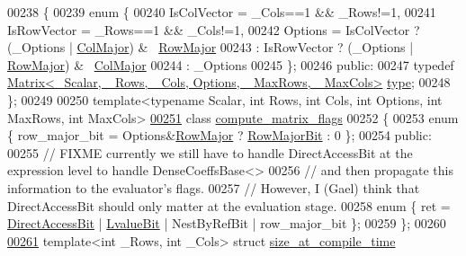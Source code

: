 \begin{DoxyCode}
{00238 \{
00239     \textcolor{keyword}{enum} \{
00240       IsColVector = \_Cols==1 && \_Rows!=1,
00241       IsRowVector = \_Rows==1 && \_Cols!=1,
00242       Options = IsColVector ? (\_Options | \hyperlink{group__enums_ggaacded1a18ae58b0f554751f6cdf9eb13a0cbd4bdd0abcfc0224c5fcb5e4f6669a}{ColMajor}) & ~\hyperlink{group__enums_ggaacded1a18ae58b0f554751f6cdf9eb13acfcde9cd8677c5f7caf6bd603666aae3}{RowMajor}
00243               : IsRowVector ? (\_Options | \hyperlink{group__enums_ggaacded1a18ae58b0f554751f6cdf9eb13acfcde9cd8677c5f7caf6bd603666aae3}{RowMajor}) & ~\hyperlink{group__enums_ggaacded1a18ae58b0f554751f6cdf9eb13a0cbd4bdd0abcfc0224c5fcb5e4f6669a}{ColMajor}
00244               : \_Options
00245     \};
00246   \textcolor{keyword}{public}:
00247     \textcolor{keyword}{typedef} \hyperlink{group___core___module_class_eigen_1_1_matrix}{Matrix<\_Scalar, \_Rows, \_Cols, Options, \_MaxRows, \_MaxCols>}
       \hyperlink{group___core___module_class_eigen_1_1_matrix}{type};
00248 \};
00249 
00250 \textcolor{keyword}{template}<\textcolor{keyword}{typename} Scalar, \textcolor{keywordtype}{int} Rows, \textcolor{keywordtype}{int} Cols, \textcolor{keywordtype}{int} Options, \textcolor{keywordtype}{int} MaxRows, \textcolor{keywordtype}{int} MaxCols>
\hyperlink{class_eigen_1_1internal_1_1compute__matrix__flags}{00251} \textcolor{keyword}{class }\hyperlink{class_eigen_1_1internal_1_1compute__matrix__flags}{compute\_matrix\_flags}
00252 \{
00253     \textcolor{keyword}{enum} \{ row\_major\_bit = Options&\hyperlink{group__enums_ggaacded1a18ae58b0f554751f6cdf9eb13acfcde9cd8677c5f7caf6bd603666aae3}{RowMajor} ? \hyperlink{group__flags_gae4f56c2a60bbe4bd2e44c5b19cbe8762}{RowMajorBit} : 0 \};
00254   \textcolor{keyword}{public}:
00255     \textcolor{comment}{// FIXME currently we still have to handle DirectAccessBit at the expression level to handle
       DenseCoeffsBase<>}
00256     \textcolor{comment}{// and then propagate this information to the evaluator's flags.}
00257     \textcolor{comment}{// However, I (Gael) think that DirectAccessBit should only matter at the evaluation stage.}
00258     \textcolor{keyword}{enum} \{ ret = \hyperlink{group__flags_gabf1e9d0516a933445a4c307ad8f14915}{DirectAccessBit} | \hyperlink{group__flags_gae2c323957f20dfdc6cb8f44428eaec1a}{LvalueBit} | NestByRefBit | row\_major\_bit \};
00259 \};
00260 
\hyperlink{struct_eigen_1_1internal_1_1size__at__compile__time}{00261} \textcolor{keyword}{template}<\textcolor{keywordtype}{int} \_Rows, \textcolor{keywordtype}{int} \_Cols> \textcolor{keyword}{struct }\hyperlink{struct_eigen_1_1internal_1_1size__at__compile__time}{size\_at\_compile\_time}
}
\end{DoxyCode}
